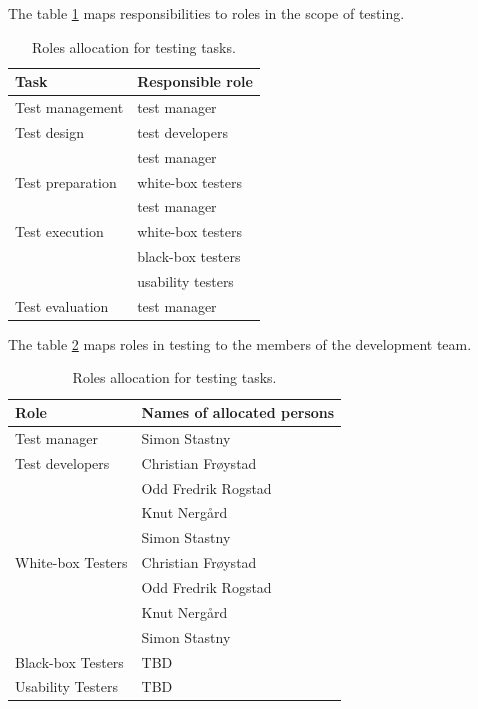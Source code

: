 \documentclass[11pt]{book}
\begin{document}
The table \ref{tab:test_plan_tasks_allocation} maps responsibilities to roles in the scope of testing.

\begin{table}[H]
	\centering
	\begin{tabular}{| l | l |}
		\hline
		Task 				& Responsible role 	\\ \hline

		Test management 	& test manager 		\\ \hline
		
		Test design 		& test developers 	\\
							& test manager 		\\ \hline
		
		Test preparation 	& white-box testers \\
							& test manager 		\\ \hline
		
		Test execution 		& white-box testers \\
							& black-box testers \\
							& usability testers \\ \hline
		
		Test evaluation 	& test manager 		\\ \hline
	\end{tabular}
	\label{tab:test_plan_tasks_allocation}
	\caption{Roles allocation for testing tasks.}
\end{table}

The table \ref{tab:test_plan_roles_allocation} maps roles in testing to the members of the development team.

\begin{table}[H]
	\centering
	\begin{tabular}{| l | l |}
		\hline
		Role 				& Names of allocated persons 	\\ \hline

		Test manager 		& Simon Stastny 				\\ \hline

		Test developers 	& Christian Frøystad 			\\
							& Odd Fredrik Rogstad 			\\
							& Knut Nergård 					\\
							& Simon Stastny 				\\ \hline

		White-box Testers 	& Christian Frøystad 			\\
							& Odd Fredrik Rogstad 			\\
							& Knut Nergård 					\\
							& Simon Stastny 				\\ \hline

		Black-box Testers 	& TBD 							\\ \hline %

		Usability Testers 	& TBD 							\\ \hline %
	\end{tabular}
	\label{tab:test_plan_roles_allocation}
	\caption{Roles allocation for testing tasks.}
\end{table}
\end{document}
